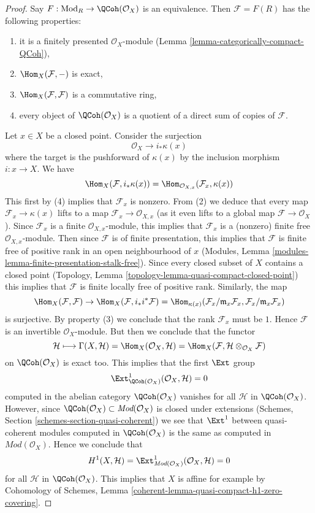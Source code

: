 \begin{proof}
Say $F : \text{Mod}_R \to \QCoh(\mathcal{O}_X)$ is an equivalence.
Then $\mathcal{F} = F(R)$ has the following properties:
\begin{enumerate}
\item it is a finitely presented $\mathcal{O}_X$-module
(Lemma \ref{lemma-categorically-compact-QCoh}),
\item $\Hom_X(\mathcal{F}, -)$ is exact,
\item $\Hom_X(\mathcal{F}, \mathcal{F})$ is a commutative ring,
\item every object of $\QCoh(\mathcal{O}_X)$ is a quotient of
a direct sum of copies of $\mathcal{F}$.
\end{enumerate}
Let $x \in X$ be a closed point. Consider the surjection
$$
\mathcal{O}_X \to i_*\kappa(x)
$$
where the target is the pushforward of $\kappa(x)$ by the
inclusion morphism $i : x \to X$. We have
$$
\Hom_X(\mathcal{F}, i_*\kappa(x)) =
\Hom_{\mathcal{O}_{X, x}}(\mathcal{F}_x, \kappa(x))
$$
This first by (4) implies that $\mathcal{F}_x$ is nonzero.
From (2) we deduce that every map $\mathcal{F}_x \to \kappa(x)$
lifts to a map $\mathcal{F}_x \to \mathcal{O}_{X, x}$ (as it
even lifts to a global map $\mathcal{F} \to \mathcal{O}_X$).
Since $\mathcal{F}_x$ is a finite $\mathcal{O}_{X, x}$-module,
this implies that $\mathcal{F}_x$ is a (nonzero)
finite free $\mathcal{O}_{X, x}$-module.
Then since $\mathcal{F}$ is of finite presentation, this implies
that $\mathcal{F}$ is finite free of positive rank
in an open neighbourhood of $x$
(Modules, Lemma \ref{modules-lemma-finite-presentation-stalk-free}).
Since every closed subset of $X$ contains a closed point 
(Topology, Lemma \ref{topology-lemma-quasi-compact-closed-point})
this implies that $\mathcal{F}$ is finite locally free of positive rank.
Similarly, the map
$$
\Hom_X(\mathcal{F}, \mathcal{F}) \to
\Hom_X(\mathcal{F}, i_*i^*\mathcal{F}) =
\Hom_{\kappa(x)}(\mathcal{F}_x/\mathfrak m_x \mathcal{F}_x,
\mathcal{F}_x/\mathfrak m_x \mathcal{F}_x)
$$
is surjective. By property (3) we conclude that the rank $\mathcal{F}_x$
must be $1$. Hence $\mathcal{F}$ is an invertible $\mathcal{O}_X$-module.
But then we conclude that the functor
$$
\mathcal{H}
\longmapsto
\Gamma(X, \mathcal{H}) = \Hom_X(\mathcal{O}_X, \mathcal{H}) =
\Hom_X(\mathcal{F}, \mathcal{H} \otimes_{\mathcal{O}_X} \mathcal{F})
$$
on $\QCoh(\mathcal{O}_X)$ is exact too. This implies that the first
$\Ext$ group
$$
\Ext^1_{\QCoh(\mathcal{O}_X)}(\mathcal{O}_X, \mathcal{H}) = 0
$$
computed in the abelian category $\QCoh(\mathcal{O}_X)$ vanishes for all
$\mathcal{H}$ in $\QCoh(\mathcal{O}_X)$. However, since
$\QCoh(\mathcal{O}_X) \subset \textit{Mod}(\mathcal{O}_X)$
is closed under extensions
(Schemes, Section \ref{schemes-section-quasi-coherent})
we see that $\Ext^1$ between quasi-coherent modules
computed in $\QCoh(\mathcal{O}_X)$ is the same as computed
in $\textit{Mod}(\mathcal{O}_X)$. Hence we conclude that
$$
H^1(X, \mathcal{H}) =
\Ext^1_{\textit{Mod}(\mathcal{O}_X)}(\mathcal{O}_X, \mathcal{H}) = 0
$$
for all $\mathcal{H}$ in $\QCoh(\mathcal{O}_X)$.
This implies that $X$ is affine for example by
Cohomology of Schemes, Lemma
\ref{coherent-lemma-quasi-compact-h1-zero-covering}.
\end{proof}


